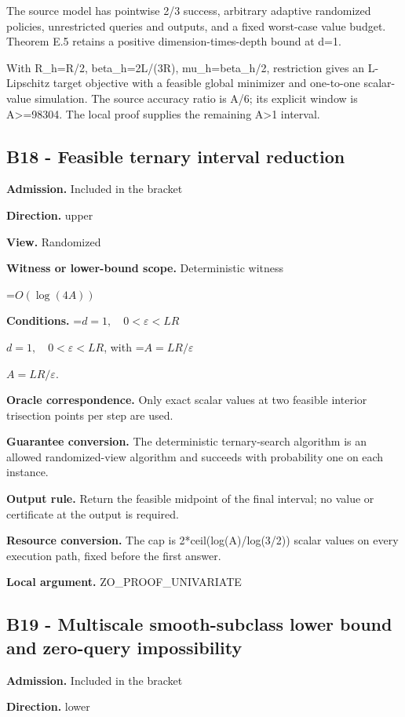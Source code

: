 \documentclass[10pt,a4paper]{article}
\newcommand{\AtlasMath}[1]{\par\begingroup\centering\setbox0=\hbox{$\displaystyle #1$}\ifdim\wd0>1.4\linewidth\typeout{ATLAS WIDE FORMULA: \the\wd0}\fi\ifdim\wd0>\linewidth\resizebox{\linewidth}{!}{\box0}\else\box0\fi\par\endgroup}
\newcommand{\AtlasInlineMath}[1]{\begingroup\setbox0=\hbox{$#1$}\ifdim\wd0>.4\linewidth\endgroup\AtlasMath{#1}\else\endgroup$#1$\fi}
\begin{document}
The source model has pointwise 2/3 success, arbitrary adaptive randomized policies, unrestricted queries and outputs, and a fixed worst-case value budget. Theorem E.5 retains a positive dimension-times-depth bound at d=1.

With R\_\allowbreak{}h=R/2, beta\_\allowbreak{}h=2L/(3R), mu\_\allowbreak{}h=beta\_\allowbreak{}h/2, restriction gives an L-Lipschitz target objective with a feasible global minimizer and one-to-one scalar-value simulation. The source accuracy ratio is A/6; its explicit window is A>=98304. The local proof supplies the remaining A>1 interval.

\subsection{B18 - Feasible ternary interval reduction}
\textbf{Admission.} Included in the bracket

\textbf{Direction.} upper

\textbf{View.} Randomized

\textbf{Witness or lower-bound scope.} Deterministic witness

\AtlasMath{O(\log(4A))}
\textbf{Conditions.} \AtlasInlineMath{d=1,\quad 0<\varepsilon<LR}, with \AtlasInlineMath{A=LR/\varepsilon}.

\textbf{Oracle correspondence.} Only exact scalar values at two feasible interior trisection points per step are used.

\textbf{Guarantee conversion.} The deterministic ternary-search algorithm is an allowed randomized-view algorithm and succeeds with probability one on each instance.

\textbf{Output rule.} Return the feasible midpoint of the final interval; no value or certificate at the output is required.

\textbf{Resource conversion.} The cap is 2*ceil(log(A)/log(3/2)) scalar values on every execution path, fixed before the first answer.

\textbf{Local argument.} ZO\_\allowbreak{}PROOF\_\allowbreak{}UNIVARIATE

\subsection{B19 - Multiscale smooth-subclass lower bound and zero-query impossibility}
\textbf{Admission.} Included in the bracket

\textbf{Direction.} lower
\end{document}
